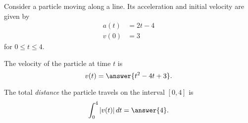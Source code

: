 \documentclass{ximera}
\author{Nela Lakos \and Kyle Parsons}
\begin{document}
\begin{exercise}

Consider a particle moving along a line.  Its acceleration and initial velocity are given by
\begin{align*}
a(t) &= 2t-4\\
v(0) &= 3
\end{align*}
for $0\leq t\leq4$.

The velocity of the particle at time $t$ is
\[
v(t) = \answer{t^2-4t+3}.
\]

The total \emph{distance} the particle travels on the interval $[0,4]$ is
\[
\int_0^4 \left|v(t)\right| \d t = \answer{4}.
\]

\end{exercise}
\end{document}
